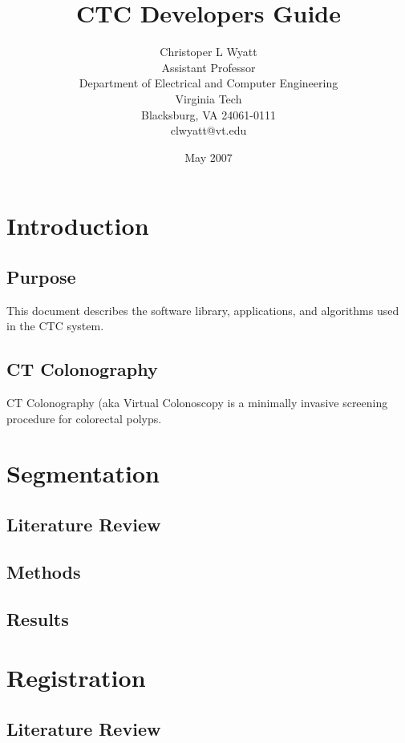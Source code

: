 \documentclass[12pt]{book}
\title{CTC Developers Guide}
\author{Christoper L Wyatt \\
  Assistant Professor \\
  Department of Electrical and Computer Engineering\\
  Virginia Tech\\
  Blacksburg, VA 24061-0111 \\
  clwyatt@vt.edu 
}
\date{May 2007}
\begin{document}
    
\maketitle

\tableofcontents

%
\part{Introduction}
\chapter{Purpose}
This document describes the software library, applications, and
algorithms used in the CTC system.

\chapter{CT Colonography}
CT Colonography (aka Virtual Colonoscopy \cite{Vining1996} is a
minimally invasive screening procedure for colorectal polyps.

%
\part{Segmentation}
\chapter{Literature Review}

\chapter{Methods}

\chapter{Results}

%
\part{Registration}
\chapter{Literature Review}
\end{document}
